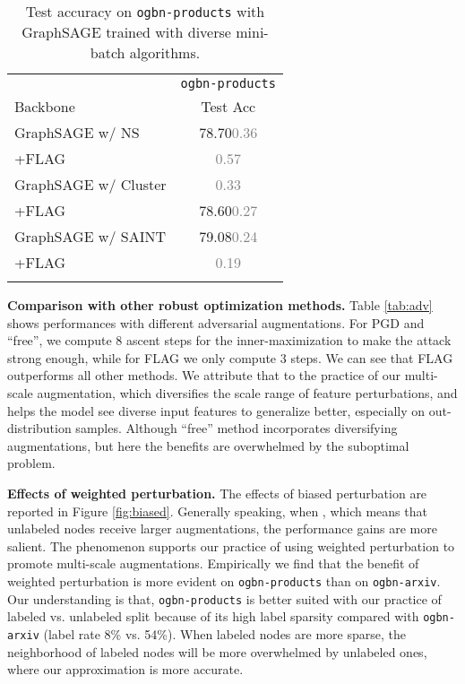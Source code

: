 \documentclass[11pt]{article}
\newcommand{\bftab}{\fontseries{b}\selectfont}
\begin{document}
\begin{table}[t]
\label{tab:dp}
\end{table} \begin{table}[t] \centering
\caption{Test accuracy on \texttt{ogbn-products} with GraphSAGE trained with diverse mini-batch algorithms.}
\centering
\begin{tabular}{lc}
\Xhline{2\arrayrulewidth}
& \texttt{ogbn-products} \\
 Backbone	& Test Acc  \\
\hline\hline
GraphSAGE w/ NS & 78.70\textcolor{gray}{ {0.36}} \\
+FLAG & \bftab79.36\textcolor{gray}{ {0.57}} \\
\hline
GraphSAGE w/ Cluster & \bftab78.97\textcolor{gray}{ {0.33}}\\
+FLAG & 78.60\textcolor{gray}{ {0.27}} \\
\hline
GraphSAGE w/ SAINT  & 79.08\textcolor{gray}{ {0.24}}\\
+FLAG & \bftab79.60\textcolor{gray}{ {0.19}} \\
\Xhline{2\arrayrulewidth}
\end{tabular}

\label{tab:batch}
\end{table} 
{\bf Comparison with other robust optimization methods.} Table \ref{tab:adv} shows performances with different adversarial augmentations. For PGD and ``free'', we compute 8 ascent steps for the inner-maximization to make the attack strong enough, while for FLAG we only compute 3 steps. We can see that FLAG outperforms all other methods. We attribute that to the practice of our multi-scale augmentation, which diversifies the scale range of feature perturbations, and helps the model see diverse input features to generalize better, especially on out-distribution samples. Although ``free'' method incorporates diversifying augmentations, but here the benefits are overwhelmed by the suboptimal problem.


{\bf Effects of weighted perturbation.} The effects of biased perturbation are reported in Figure \ref{fig:biased}. Generally speaking, when , which means that unlabeled nodes receive larger augmentations, the performance gains are more salient. The phenomenon supports our practice of using weighted perturbation to promote multi-scale augmentations. Empirically we find that the benefit of weighted perturbation is more evident on \texttt{ogbn-products} than on \texttt{ogbn-arxiv}. Our understanding is that, \texttt{ogbn-products} is better suited with our practice of labeled vs. unlabeled split because of its high label sparsity compared with \texttt{ogbn-arxiv} (label rate 8\% vs. 54\%). When labeled nodes are more sparse, the neighborhood of labeled nodes will be more overwhelmed by unlabeled ones, where our approximation is more accurate.
\end{document}
